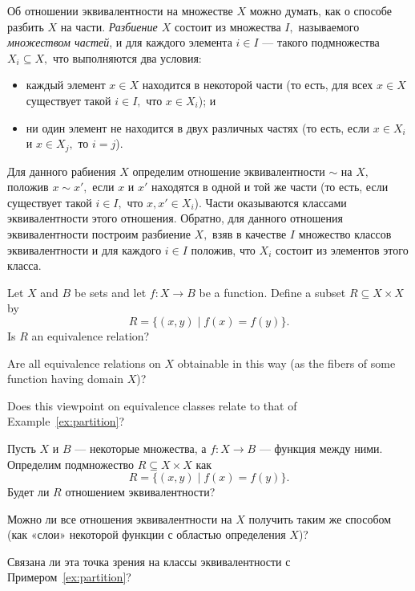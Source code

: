 \documentclass[../main/CT4S-EN-RU]{subfiles}
\begin{document}
\begin{exampleRUS}[Разбиения]\label{ex:partition}
Об отношении эквивалентности на множестве $X$ можно думать, как о способе разбить $X$ на части. {\em Разбиение $X$} состоит из множества $I,$ называемого {\em множеством частей}, и для каждого элемента $i\in I$ — такого подмножества $X_i\subseteq X,$ что выполняются два условия:
\begin{itemize}
\item каждый элемент $x\in X$ находится в некоторой части (то есть, для всех $x\in X$ существует такой $i\in I,$ что $x\in X_i$); и
\item ни один элемент не находится в двух различных частях (то есть, если $x\in X_i$ и $x\in X_j,$ то $i=j$).
\end{itemize}

Для данного рабиения $X$ определим отношение эквивалентности $\sim$ на $X,$ положив $x\sim x',$ если $x$ и $x'$ находятся в одной и той же части (то есть, если существует такой $i\in I,$ что $x,x'\in X_i$). Части оказываются классами эквивалентности этого отношения. Обратно, для данного отношения эквивалентности построим разбиение $X,$ взяв в качестве $I$ множество классов эквивалентности и для каждого $i\in I$ положив, что $X_i$ состоит из элементов этого класса.
\end{exampleRUS}

\begin{exerciseENG}
Let $X$ and $B$ be sets and let $f\colon X{→} B$ be a function. Define a subset $R\subseteq X\times X$ by $$R=\{(x,y){\;|\;}f(x)=f(y)\}.$$ 
\sexc Is $R$ an equivalence relation? 
\item Are all equivalence relations on $X$ obtainable in this way (as the fibers of some function having domain $X$)?
\item Does this viewpoint on equivalence classes relate to that of Example~\ref{ex:partition}?
\endsexc
\end{exerciseENG}

\begin{exerciseRUS}
Пусть $X$ и $B$ — некоторые множества, а $f\colon X{→} B$ — функция между ними. Определим подмножество $R\subseteq X\times X$ как $$R=\{(x,y){\;|\;}f(x)=f(y)\}.$$ 
\sexc Будет ли $R$ отношением эквивалентности? 
\item Можно ли все отношения эквивалентности на $X$ получить таким же способом (как «слои» некоторой функции с областью определения $X$)?
\item Связана ли эта точка зрения на классы эквивалентности с Примером~\ref{ex:partition}?
\endsexc
\end{exerciseRUS}
\end{document}
